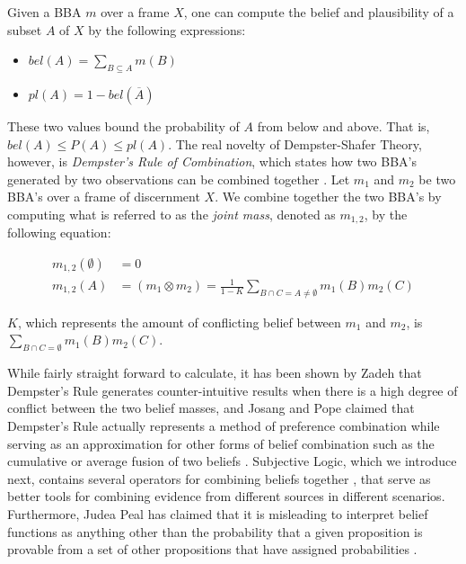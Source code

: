 \documentclass[thesis.tex]{subfiles}
\begin{document}
Given a BBA $m$ over a frame $X$, one can compute the belief and plausibility of a subset
$A$ of $X$ by the following expressions:

\begin{itemize}
  \item $bel(A) = \sum_{B \subseteq A} m(B)$
  \item $pl(A) = 1 - bel(\overline{A})$
\end{itemize}

These two values bound the probability of $A$ from below and above. That is,
$bel(A) \leq P(A) \leq pl(A)$. The real novelty of Dempster-Shafer Theory, however, is
\emph{Dempster's Rule of Combination}, which states how two BBA's generated
by two observations can be combined together \cite{dempster1968generalization}. Let $m_1$ and $m_2$ be two BBA's over a
frame of discernment $X$. We combine together the two BBA's by computing what is referred to
as the \emph{joint mass}, denoted as $m_{1,2}$, by the following equation:

\begin{equation*}
  \begin{split}
    m_{1,2}\left(\emptyset\right) & = 0 \\
    m_{1,2}\left(A\right)         & = \left( m_1 \otimes m_2\right) = \frac{1}{1 - K} \sum_{B \cap C = A \neq \emptyset} m_1(B) m_2(C)
  \end{split}
\end{equation*}

$K$, which represents the amount of conflicting belief between $m_1$ and $m_2$, is $\sum_{B \cap C = \emptyset} m_1(B) m_2(C)$.

While fairly straight forward to calculate, it has been shown by Zadeh \cite{zadeh1979validity, zadeh1986simple}
that Dempster's Rule generates counter-intuitive results when there is a high degree of
conflict between the two belief masses, and Josang and Pope claimed that Dempster's Rule actually
represents a method of preference combination while serving as an approximation for other forms of belief
combination such as the cumulative or average fusion of two beliefs \cite{josang2012dempster}. Subjective Logic, which we introduce next,
contains several operators for combining beliefs together \cite{josang2012interpretation, josang2010cumulative, josang2009fission, josang2009cumulative},
that serve as better tools for combining evidence from different sources in different scenarios.
Furthermore, Judea Peal has claimed that it is misleading to interpret belief functions as anything
other than the probability that a given proposition is provable from a set of other
propositions that have assigned probabilities \cite{pearl1988probabilistic, pearl1988probability, pearl1990reasoning}.
\end{document}
